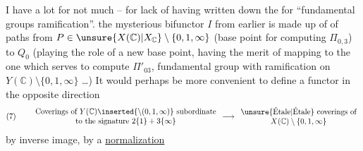 I have  a lot for not much -- for lack of having written down the    for ``fundamental groups  ramification''.  the mysterious bifunctor $I$ from earlier is made up of  of paths from $P\in\unsure{X(\mathbb C)|X_{\mathbb C}}\setminus\{0,1,\infty\}$ (base point for computing $\Pi_{0,3}$) to $Q_0$ (playing the role of a new base point, having the merit of mapping to the one  which serves to compute $\Pi'_{03}$, fundamental group with ramification on $Y(\mathbb C)\setminus\{0,1,\infty\}$ \dots) It would perhaps be more convenient to define  a functor in the opposite direction
\[
(7)\qquad
\begin{array}{c}
\text{Coverings of }Y(\mathbb C)\inserted{\setminus(0,1,\infty)}\ \text{subordinate}\\
\text{to the signature }2\{1\}+3\{\infty\}
\end{array}
\longrightarrow
\begin{array}{c}
\text{\unsure{Étale|Étale} coverings of}\\
X(\mathbb C)\setminus\{0,1,\infty\}
\end{array}
\]
by inverse image,  by a \uline{normalization}